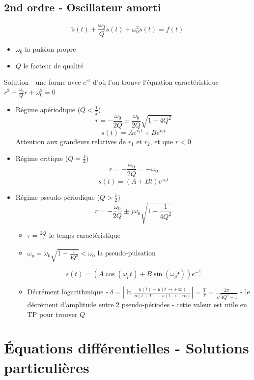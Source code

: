 \documentclass[openany]{book}
\begin{document}
\subsection{2nd ordre - Oscillateur amorti}
\[ \ddot{s}(t) + \frac{\omega_0}{Q}\dot{s}(t) + \omega_0^2s(t) = f(t) \]
\begin{itemize}
    \item $\omega_0$ la pulsion propre
    \item $Q$ le facteur de qualité
\end{itemize}
Solution - une forme avec $ e^{rt} $ d'où l'on trouve l'équation caractéristique $ r^2 + \frac{\omega_0}{Q}r + \omega_0^2 = 0 $
\begin{itemize}
    \item Régime apériodique ($Q < \frac{1}{2}$)
        \[ r = -\frac{\omega_0}{2Q} \pm \frac{\omega_0}{2Q}\sqrt{1-4Q^2} \]
        \[ s(t) = Ae^{r_1t} + Be^{r_2t} \]
        Attention aux grandeurs relatives de $r_1$ et $r_2$, et que $r < 0$
    \item Régime critique ($Q = \frac{1}{2}$)
        \[ r = -\frac{\omega_0}{2Q} = -\omega_0 \]
        \[ s(t) = (A + Bt)e^{\omega_0t} \]
    \item Régime pseudo-périodique ($Q > \frac{1}{2}$)
        \[ r = -\frac{\omega_0}{2Q}\pm j\omega_0\sqrt{1-\frac{1}{4Q^2}} \]
        \begin{itemize}
            \item $\tau = \frac{2Q}{\omega_0} $ le temps caractéristique
            \item $ \omega_p = \omega_0\sqrt{1-\frac{1}{4Q^2}} < \omega_0 $ la pseudo-pulsation
        \end{itemize}
        \[ s(t) = (A\cos{(\omega_pt)} + B\sin{(\omega_pt)})e^{-\frac{t}{\tau}} \]
        \begin{itemize}
            \item Décrément logarithmique - $ \delta = |\ln{\frac{u(t) - u(t \rightarrow + \infty)}{u(t+T) - u(t \rightarrow + \infty)}}| = \frac{T}{\tau} = \frac{2\pi}{\sqrt{4Q^2-1}}$ - le décrément d'amplitude entre 2 pseudo-périodes - cette valeur est utile en TP pour trouver $Q$
        \end{itemize}
\end{itemize}

\section{Équations différentielles - Solutions particulières}
\end{document}
